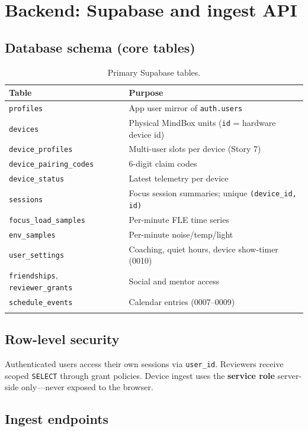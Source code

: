 \documentclass[11pt,a4paper]{report}
\begin{document}
\chapter{Backend: Supabase and ingest API}

\section{Database schema (core tables)}

\begin{longtable}{@{}p{3.4cm}p{9.2cm}@{}}
\toprule
\textbf{Table} & \textbf{Purpose} \\
\midrule
\endhead
\texttt{profiles} & App user mirror of \texttt{auth.users} \\
\texttt{devices} & Physical MindBox units (\texttt{id} = hardware device id) \\
\texttt{device\_profiles} & Multi-user slots per device (Story 7) \\
\texttt{device\_pairing\_codes} & 6-digit claim codes \\
\texttt{device\_status} & Latest telemetry per device \\
\texttt{sessions} & Focus session summaries; unique \texttt{(device\_id, id)} \\
\texttt{focus\_load\_samples} & Per-minute FLE time series \\
\texttt{env\_samples} & Per-minute noise/temp/light \\
\texttt{user\_settings} & Coaching, quiet hours, device show-timer (0010) \\
\texttt{friendships}, \texttt{reviewer\_grants} & Social and mentor access \\
\texttt{schedule\_events} & Calendar entries (0007--0009) \\
\bottomrule
\caption{Primary Supabase tables.}
\end{longtable}

\section{Row-level security}

Authenticated users access their own sessions via \texttt{user\_id}. Reviewers receive
scoped \texttt{SELECT} through grant policies. Device ingest uses the \textbf{service
role} server-side only---never exposed to the browser.

\section{Ingest endpoints}
\end{document}
